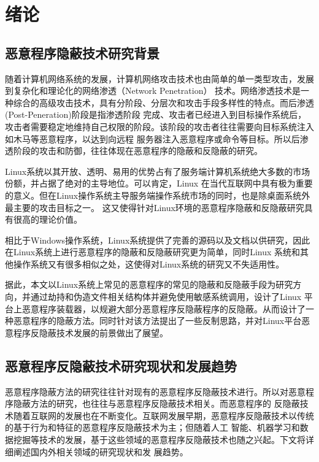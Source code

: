 \chapter{绪论}

\section{恶意程序隐蔽技术研究背景}
随着计算机网络系统的发展，计算机网络攻击技术也由简单的单一类型攻击，发展到复杂化和理论化的网络渗透（Network Penetration）\cite{Mirjalili:2014}
技术。网络渗透技术是一种综合的高级攻击技术，具有分阶段、分层次和攻击手段多样性的特点。而后渗透(Post-Peneration)\cite{ENGEBRETSON2013167}阶段是指渗透阶段
完成、攻击者已经进入到目标操作系统后，攻击者需要稳定地维持自己权限的阶段。该阶段的攻击者往往需要向目标系统注入如木马等恶意程序，以达到向远程
服务器注入恶意程序或命令等目标。所以后渗透阶段的攻击和防御，往往体现在恶意程序的隐蔽和反隐蔽的研究。

Linux系统以其开放、透明、易用的优势占有了服务端计算机系统绝大多数的市场份额\cite{LinuxShare}，并占据了绝对的主导地位。可以肯定，Linux
在当代互联网中具有极为重要的意义。但在Linux操作系统主导服务端操作系统市场的同时，也是除桌面系统外最主要的攻击目标之一。
这又使得针对Linux环境的恶意程序隐蔽和反隐蔽研究具有很高的理论价值。

相比于Windows操作系统，Linux系统提供了完善的源码以及文档以供研究，因此在Linux系统上进行恶意程序的隐蔽和反隐蔽研究更为简单，同时Linux
系统和其他操作系统又有很多相似之处，这使得对Linux系统的研究又不失适用性。

据此，本文以Linux系统上常见的恶意程序的常见的隐蔽和反隐蔽手段为研究方向，并通过劫持和伪造文件相关结构体并避免使用敏感系统调用，设计了Linux
平台上恶意程序装载器，以规避大部分恶意程序反隐蔽程序的反隐蔽。从而设计了一种恶意程序的隐蔽方法。同时针对该方法提出了一些反制思路，并对Linux平台恶意程序反隐蔽技术发展的前景做出了展望。

\section{恶意程序反隐蔽技术研究现状和发展趋势}

恶意程序隐蔽方法的研究往往针对现有的恶意程序反隐蔽技术进行。所以对恶意程序隐蔽方法的研究，也往往与恶意程序反隐蔽技术相关。而恶意程序的
反隐蔽技术随着互联网的发展也在不断变化。互联网发展早期，恶意程序反隐蔽技术以传统的基于行为和特征的恶意程序反隐蔽技术为主；但随着人工
智能、机器学习和数据挖掘等技术的发展，基于这些领域的恶意程序反隐蔽技术也随之兴起。下文将详细阐述国内外相关领域的研究现状和发
展趋势。

